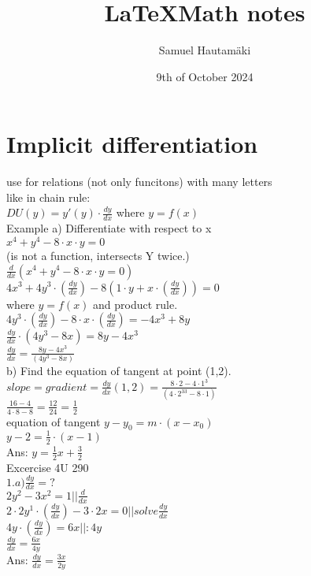 \documentclass{article}
\title{\LaTeX Math notes}
\author{Samuel Hautamäki}
\date{9th of October 2024}
\begin{document}
  \maketitle
   
  \section{Implicit differentiation}
  use for relations (not only funcitons) with many letters\\
  like in chain rule:\\
  $D U (y) = y'(y)\cdot \frac{dy}{dx}$ where $y=f(x)$\\

  Example a) Differentiate with respect to x\\
  $x^4+y^4-8\cdot x\cdot y =0$\\
  (is not a function, intersects Y twice.)\\
  $\frac{d}{dx}(x^4+y^4-8\cdot x\cdot y=0)$\\
  $4x^3+4y^3\cdot (\frac{dy}{dx})-8(1\cdot y+x\cdot (\frac{dy}{dx}))=0$\\
  where $y=f(x)$ and product rule.\\
  $4y^3\cdot(\frac{dy}{dx})-8\cdot x\cdot (\frac{dy}{dx})=-4x^3+8y$\\
  $\frac{dy}{dx}\cdot(4y^3-8x)=8y-4x^3$\\
  $\frac{dy}{dx}=\frac{8y-4x^3}{(4y^3-8x)}$\\
  b) Find the equation of tangent at point (1,2).\\
  $slope=gradient=\frac{dy}{dx}(1,2)=\frac{8\cdot 2-4\cdot 1^3}{(4\cdot 2^33-8\cdot1)}$\\
  $\frac{16-4}{4\cdot8-8}=\frac{12}{24}=\frac{1}{2}$\\
  equation of tangent $y-y_0=m\cdot (x-x_0)$\\
  $y-2=\frac{1}{2}\cdot(x-1)$\\
  Ans: $y=\frac{1}{2}x+\frac{3}{2}$\\
  Excercise 4U 290\\
  $1. a) \frac{dy}{dx}=?$\\
  $2y^2-3x^2=1 || \frac{d}{dx}$\\
  $2\cdot 2y^1\cdot (\frac{dy}{dx})-3\cdot2x=0 || solve \frac{dy}{dx}$\\
  $4y\cdot (\frac{dy}{dx})=6x ||:4y$\\
  $\frac{dy}{dx}=\frac{6x}{4y}$\\
  Ans: $\frac{dy}{dx}=\frac{3x}{2y}$\\
\end{document}
